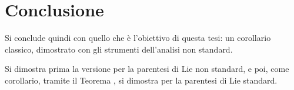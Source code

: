 \section{Conclusione}
Si conclude quindi con quello che è l'obiettivo di questa tesi: un corollario classico, dimostrato con gli strumenti dell'analisi non standard.

Si dimostra prima la versione per la parentesi di Lie non standard, e poi, come corollario, tramite il Teorema , si dimostra per la parentesi di Lie standard. 

